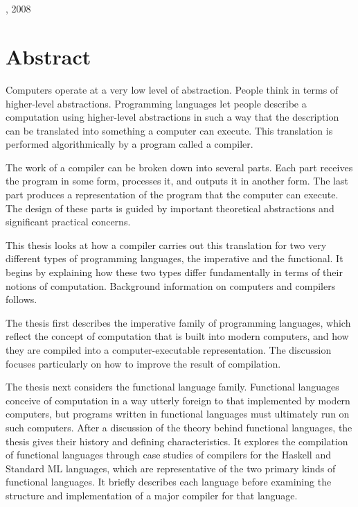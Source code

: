 \begingroup
\let\clearpage\relax
\let\cleardoublepage\relax
\let\cleardoublepage\relax

\begin{center}
    \myDisplayTitle \\ \medskip
  
    \myName \\
    \myUni, 2008
\end{center}

\chapter*{Abstract}
Computers operate at a very low level of abstraction. People think in terms of higher-level abstractions. Programming languages let people describe a computation using higher-level abstractions in such a way that the description can be translated into something a computer can execute. This translation is performed algorithmically by a program called a compiler.

The work of a compiler can be broken down into several parts. Each part receives the program in some form, processes it, and outputs it in another form. The last part produces a representation of the program that the computer can execute. The design of these parts is guided by important theoretical abstractions and significant practical concerns.

This thesis looks at how a compiler carries out this translation for two very different types of programming languages, the imperative and the functional. It begins by explaining how these two types differ fundamentally in terms of their notions of computation. Background information on computers and compilers follows.

The thesis first describes the imperative family of programming languages, which reflect the concept of computation that is built into modern computers, and how they are compiled into a computer-executable representation. The discussion focuses particularly on how to improve the result of compilation.

The thesis next considers the functional language family. Functional languages conceive of computation in a way utterly foreign to that implemented by modern computers, but programs written in functional languages must ultimately run on such computers. After a discussion of the theory behind functional languages, the thesis gives their history and defining characteristics. It explores the compilation of functional languages through case studies of compilers for the Haskell and Standard ML languages, which are representative of the two primary kinds of functional languages. It briefly describes each language before examining the structure and implementation of a major compiler for that language.

